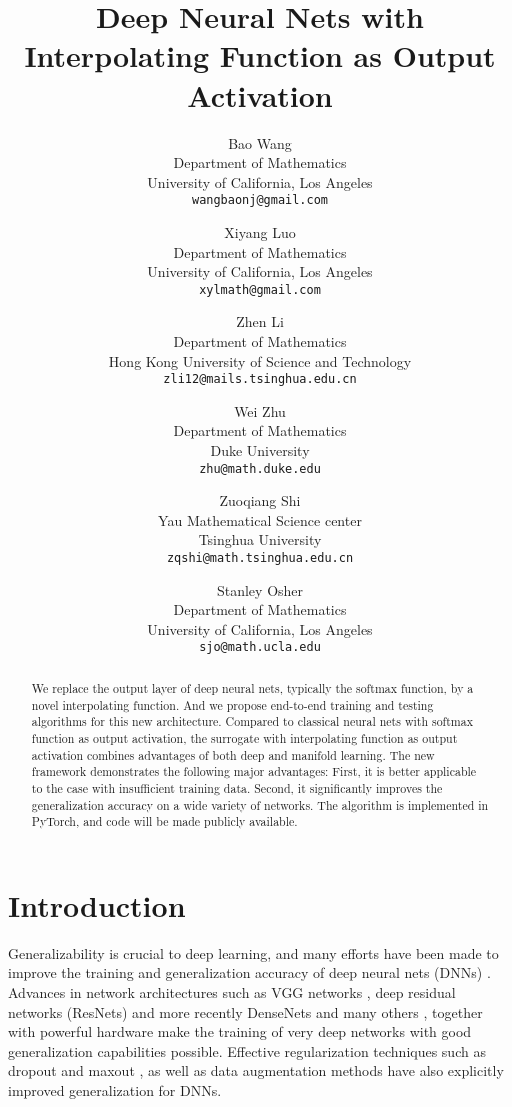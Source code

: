 \documentclass{article}
\title{Deep Neural Nets with Interpolating Function as Output Activation}
\author{
  Bao Wang \\
  Department of Mathematics\\
  University of California, Los Angeles\\
   \texttt{wangbaonj@gmail.com} \\
  \and
  Xiyang Luo \\
  Department of Mathematics\\
  University of California, Los Angeles\\
   \texttt{xylmath@gmail.com} \\
  \and
  Zhen Li \\
  Department of Mathematics\\
  Hong Kong University of Science and Technology\\
   \texttt{zli12@mails.tsinghua.edu.cn} \\
\and
  Wei Zhu \\
  Department of Mathematics\\
  Duke University\\
  \texttt{zhu@math.duke.edu} \\
\and
  Zuoqiang Shi \\
  Yau Mathematical Science center\\
  Tsinghua University\\
  \texttt{zqshi@math.tsinghua.edu.cn}\\
  \and
  Stanley Osher \\
  Department of Mathematics\\
  University of California, Los Angeles\\
  \texttt{sjo@math.ucla.edu}\\
}
\begin{document}
\maketitle

\begin{abstract}
We replace the output layer of deep neural nets, typically the softmax function, by a novel interpolating function. And we propose end-to-end training and testing algorithms for this new architecture. Compared to classical neural nets with softmax function as output activation, the surrogate with interpolating function as output activation combines advantages of both deep and manifold learning. The new framework demonstrates the following major advantages: First, it is better applicable to the case with insufficient training data. Second, it significantly improves the generalization accuracy on a wide variety of networks. The algorithm is implemented in PyTorch, and code will  be made publicly available.
\end{abstract}

\section{Introduction}
Generalizability is crucial to deep learning, and many efforts have been made to improve the training and generalization accuracy of deep neural nets (DNNs) \cite{GreedyTraining:2007,DBN:2006}. Advances in network architectures such as VGG networks \cite{VGG:2014}, deep residual networks (ResNets)\cite{DRN:2016,IdentityMap:2016} and more recently DenseNets \cite{Huang:2017CVPR} and many others \cite{Chen:2017NIPS}, together with powerful hardware make the training of very deep networks with good generalization capabilities possible. Effective regularization techniques such as dropout and maxout \cite{hinton2012improving, wan2013regularization, goodfellow2013maxout}, as well as data augmentation methods \cite{krizhevsky2012imagenet,VGG:2014, Zhu:2017DeepLearning} have also explicitly improved generalization for DNNs. 
\end{document}
